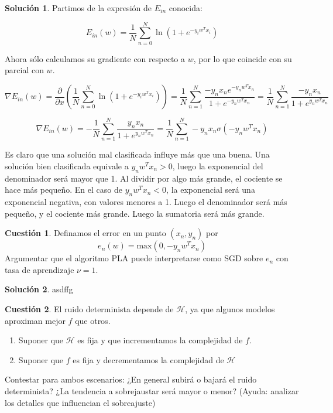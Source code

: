 \documentclass[a4paper, 11pt]{article}
\theoremstyle{definition}
\newtheorem{cuestion}{Cuestión}
\newtheorem*{solucion}{Solución}
\begin{document}
  \begin{solucion}
    Partimos de la expresión de $E_{in}$ conocida:

    $$E_{in}(w) = \frac{1}{N} \sum_{n=0}^{N}\ln \left(1 + e^{-y_iw^Tx_i} \right) $$

    Ahora sólo calculamos su gradiente con respecto a $w$, por lo que coincide con su parcial con $w$.

    $$\nabla E_{in}(w)=\frac{\partial}{\partial x} \left( \frac{1}{N} \sum_{n=0}^{N}\ln \left(1 + e^{-y_iw^Tx_i} \right) \right) = \frac{1}{N}\sum_{n=1}^{N}\frac{-y_nx_ne^{-y_nw^Tx_n}}{1+e^{-y_nw^Tx_n}} = \frac{1}{N}\sum_{n=1}^{N}\frac{-y_nx_n}{1+e^{y_nw^Tx_n}} $$

    $$\nabla E_{in}(w)=-\frac{1}{N}\sum_{n=1}^{N}\frac{y_nx_n}{1+e^{y_nw^Tx_n}} = \frac{1}{N}\sum_{n=1}^{N}-y_nx_n\sigma(-y_nw^Tx_n)$$

    Es claro que una solución mal clasificada influye más que una buena. Una solución bien clasificada equivale a $y_nw^Tx_n > 0$, luego la exponencial del denominador será mayor que 1. Al dividir por algo más grande, el cociente se hace más pequeño. En el caso de $y_nw^Tx_n < 0$, la exponencial será una exponencial negativa, con valores menores a 1. Luego el denominador será más pequeño, y el cociente más grande. Luego la sumatoria será más grande.
  \end{solucion}

  \begin{cuestion}
    Definamos el error en un punto $(x_n,y_n)$ por
      \[
      e_n(w)=\text{max}(0,-y_nw^Tx_n)
      \]
      Argumentar que el algoritmo PLA puede interpretarse como SGD sobre $e_n$ con tasa de aprendizaje $\nu=1$.
  \end{cuestion}

  \begin{solucion}
    asdffg
  \end{solucion}

  \begin{cuestion}
    El ruido determinista depende de $\mathcal{H}$, ya que algunos modelos aproximan mejor $f$ que otros.
    \begin{enumerate}
        \item Suponer que $\mathcal{H}$ es fija y que incrementamos la complejidad de $f$.
        \item Suponer que $ f$ es fija y decrementamos la complejidad de $\mathcal{H}$
    \end{enumerate}
    Contestar para ambos escenarios: ¿En general subirá o bajará el ruido determinista? ¿La tendencia a sobrejaustar será mayor o menor? (Ayuda: analizar los detalles que influencian el sobreajuste)
  \end{cuestion}
\end{document}
